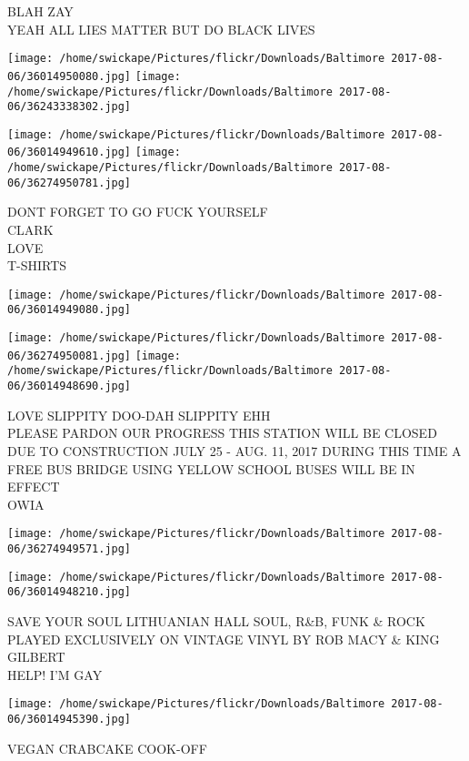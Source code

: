 \documentclass[10pt,letterpaper]{article}
\begin{document}
BLAH ZAY\\
YEAH ALL LIES MATTER BUT DO BLACK LIVES\\
\pagebreak

\texttt{[image: /home/swickape/Pictures/flickr/Downloads/Baltimore 2017-08-06/36014950080.jpg]}
\texttt{[image: /home/swickape/Pictures/flickr/Downloads/Baltimore 2017-08-06/36243338302.jpg]}

\texttt{[image: /home/swickape/Pictures/flickr/Downloads/Baltimore 2017-08-06/36014949610.jpg]}
\texttt{[image: /home/swickape/Pictures/flickr/Downloads/Baltimore 2017-08-06/36274950781.jpg]}

DONT FORGET TO GO FUCK YOURSELF\\
CLARK\\
LOVE\\
T{-}SHIRTS\\
\pagebreak

\texttt{[image: /home/swickape/Pictures/flickr/Downloads/Baltimore 2017-08-06/36014949080.jpg]}

\vspace{0.25in}
\texttt{[image: /home/swickape/Pictures/flickr/Downloads/Baltimore 2017-08-06/36274950081.jpg]}
\texttt{[image: /home/swickape/Pictures/flickr/Downloads/Baltimore 2017-08-06/36014948690.jpg]}

LOVE SLIPPITY DOO{-}DAH SLIPPITY EHH\\
PLEASE PARDON OUR PROGRESS THIS STATION WILL BE CLOSED DUE TO CONSTRUCTION JULY 25 {-} AUG. 11, 2017 DURING THIS TIME A FREE BUS BRIDGE USING YELLOW SCHOOL BUSES WILL BE IN EFFECT\\
OWIA\\
\pagebreak

\texttt{[image: /home/swickape/Pictures/flickr/Downloads/Baltimore 2017-08-06/36274949571.jpg]}

\vspace{0.25in}
\texttt{[image: /home/swickape/Pictures/flickr/Downloads/Baltimore 2017-08-06/36014948210.jpg]}

SAVE YOUR SOUL LITHUANIAN HALL SOUL, R\&B, FUNK \& ROCK PLAYED EXCLUSIVELY ON VINTAGE VINYL BY ROB MACY \& KING GILBERT\\
HELP!  I'M GAY\\
\pagebreak

\texttt{[image: /home/swickape/Pictures/flickr/Downloads/Baltimore 2017-08-06/36014945390.jpg]}

VEGAN CRABCAKE COOK{-}OFF\\
\pagebreak
\end{document}

